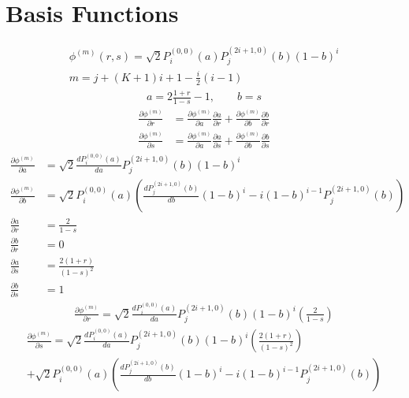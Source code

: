 \documentclass[11pt]{article}
\begin{document}
\section{Basis Functions}
\begin{gather}
\phi^{(m)}(r,s) = \sqrt{2}P_i^{(0,0)}(a)P_j^{(2i+1,0)}(b)(1-b)^i \\
m = j+(K+1)i+1-\frac{i}{2}(i-1)
\end{gather}
\begin{gather}
a = 2\frac{1+r}{1-s} - 1, \quad \quad b = s
\end{gather}
\begin{align}
\frac{\partial \phi^{(m)}}{\partial r} &= \frac{\partial \phi^{(m)}}{\partial a}\frac{\partial a}{\partial r} + \frac{\partial \phi^{(m)}}{\partial b}\frac{\partial b}{\partial r} \\
\frac{\partial \phi^{(m)}}{\partial s} &= \frac{\partial \phi^{(m)}}{\partial a}\frac{\partial a}{\partial s} + \frac{\partial \phi^{(m)}}{\partial b}\frac{\partial b}{\partial s}
\end{align}
\begin{align}
\frac{\partial \phi^{(m)}}{\partial a} & = \sqrt{2}\frac{d P_i^{(0,0)}(a)}{d a}P_j^{(2i+1,0)}(b)(1-b)^i \\
\frac{\partial \phi^{(m)}}{\partial b} & = \sqrt{2}P_i^{(0,0)}(a)\left(\frac{dP_j^{(2i+1,0)}(b)}{db}(1-b)^i -i(1-b)^{i-1}P_j^{(2i+1,0)}(b) \right) \\
\frac{\partial a}{\partial r}& = \frac{2}{1-s} \\
\frac{\partial b}{\partial r}& = 0\\
\frac{\partial a}{\partial s}& = \frac{2(1+r)}{(1-s)^2} \\
\frac{\partial b}{\partial s}& =1
\end{align}
\begin{align}
\frac{\partial \phi^{(m)}}{\partial r} = \sqrt{2}\frac{d P_i^{(0,0)}(a)}{d a}P_j^{(2i+1,0)}(b)(1-b)^i\left(\frac{2}{1-s}\right) 
\end{align}
\begin{multline}
\frac{\partial \phi^{(m)}}{\partial s} = \sqrt{2}\frac{d P_i^{(0,0)}(a)}{d a}P_j^{(2i+1,0)}(b)(1-b)^i\left(\frac{2(1+r)}{(1-s)^2}\right) \\+  \sqrt{2}P_i^{(0,0)}(a)\left(\frac{dP_j^{(2i+1,0)}(b)}{db}(1-b)^i -i(1-b)^{i-1}P_j^{(2i+1,0)}(b) \right)
\end{multline}
\end{document}
